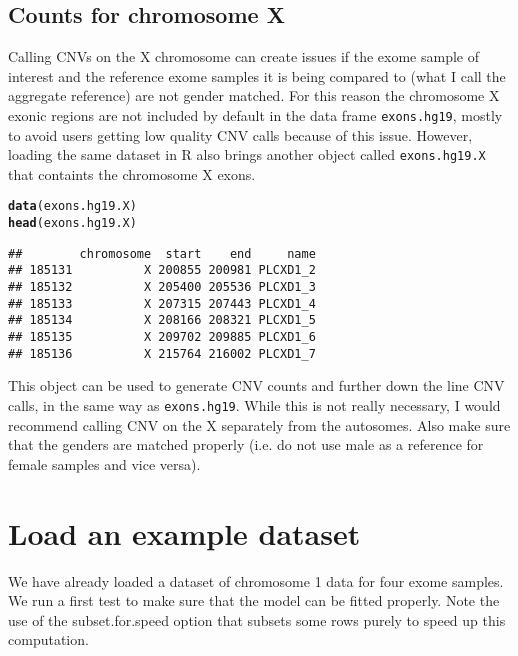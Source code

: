 \documentclass[10pt]{article}\usepackage[]{graphicx}\usepackage[]{color}
\makeatletter
\newcommand{\hlstd}[1]{\textcolor[rgb]{0.345,0.345,0.345}{#1}}%
\newcommand{\hlkwd}[1]{\textcolor[rgb]{0.737,0.353,0.396}{\textbf{#1}}}%
\newenvironment{kframe}{%
 \def\at@end@of@kframe{}%
 \ifinner\ifhmode%
  \def\at@end@of@kframe{\end{minipage}}%
  \begin{minipage}{\columnwidth}%
 \fi\fi%
 \def\FrameCommand##1{\hskip\@totalleftmargin \hskip-\fboxsep
 \colorbox{shadecolor}{##1}\hskip-\fboxsep
     \hskip-\linewidth \hskip-\@totalleftmargin \hskip\columnwidth}%
 \MakeFramed {\advance\hsize-\width
   \@totalleftmargin\z@ \linewidth\hsize
   \@setminipage}}%
 {\par\unskip\endMakeFramed%
 \at@end@of@kframe}
\newenvironment{knitrout}{}{} %
\makeatother
\begin{document}
\subsection{Counts for chromosome X}
Calling CNVs on the X chromosome can create issues if the exome sample of interest and the reference exome samples it is being compared to (what I call the aggregate reference) are not gender matched.
For this reason the chromosome X exonic regions are not included by default in the data frame \texttt{exons.hg19}, mostly to avoid users getting low quality CNV calls because of this issue.
However, loading the same dataset in R also brings another object called \texttt{exons.hg19.X} that containts the chromosome X exons.

\begin{knitrout}
\color{fgcolor}\begin{kframe}
\begin{alltt}
\hlkwd{data}\hlstd{(exons.hg19.X)}
\hlkwd{head}\hlstd{(exons.hg19.X)}
\end{alltt}
\begin{verbatim}
##        chromosome  start    end     name
## 185131          X 200855 200981 PLCXD1_2
## 185132          X 205400 205536 PLCXD1_3
## 185133          X 207315 207443 PLCXD1_4
## 185134          X 208166 208321 PLCXD1_5
## 185135          X 209702 209885 PLCXD1_6
## 185136          X 215764 216002 PLCXD1_7
\end{verbatim}
\end{kframe}
\end{knitrout}

This object can be used to generate CNV counts and further down the line CNV calls, in the same way as \texttt{exons.hg19}.
While this is not really necessary, I would recommend calling CNV on the X separately from the autosomes.
Also make sure that the genders are matched properly (i.e. do not use male as a reference for female samples and vice versa).


\section{Load an example dataset}
We have already loaded a dataset of chromosome 1 data for four exome samples.
We run a first test to make sure that the model can be fitted properly. 
Note the use of the subset.for.speed option that subsets some rows purely to speed up this computation.
\end{document}
